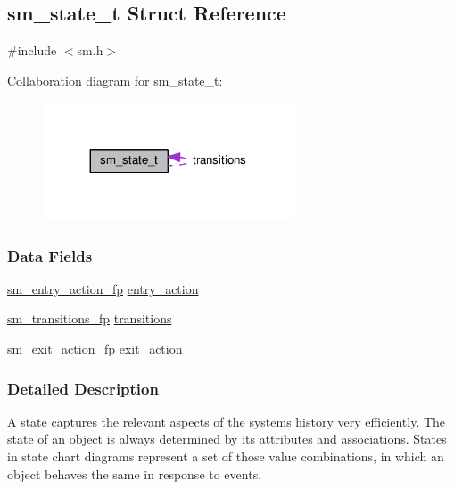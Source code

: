 \hypertarget{structsm__state__t}{}\subsection{sm\+\_\+state\+\_\+t Struct Reference}
\label{structsm__state__t}


{\ttfamily \#include $<$sm.\+h$>$}



Collaboration diagram for sm\+\_\+state\+\_\+t\+:\nopagebreak
\begin{figure}[H]
\begin{center}
\leavevmode
\includegraphics[width=212pt]{structsm__state__t__coll__graph}
\end{center}
\end{figure}
\subsubsection*{Data Fields}
\begin{DoxyCompactItemize}
\item 
\hyperlink{sm_8h_a921fca7daf06810fad2eca72b5a0bafc}{sm\+\_\+entry\+\_\+action\+\_\+fp} \hyperlink{structsm__state__t_ae5671e79c3bc83130bdeaf82c82e6f05}{entry\+\_\+action}
\item 
\hyperlink{sm_8h_a48bd707c3bca2429aee6582bd67cd273}{sm\+\_\+transitions\+\_\+fp} \hyperlink{structsm__state__t_ace0f4ad76339cbc43c48c99df054e401}{transitions}
\item 
\hyperlink{sm_8h_a0b45d5fb53866f3e67285aa38b248570}{sm\+\_\+exit\+\_\+action\+\_\+fp} \hyperlink{structsm__state__t_af372299be3ffdd7c40f91d0c0239839a}{exit\+\_\+action}
\end{DoxyCompactItemize}


\subsubsection{Detailed Description}
A state captures the relevant aspects of the system\textquotesingle{}s history very efficiently. The state of an object is always determined by its attributes and associations. States in state chart diagrams represent a set of those value combinations, in which an object behaves the same in response to events. 

